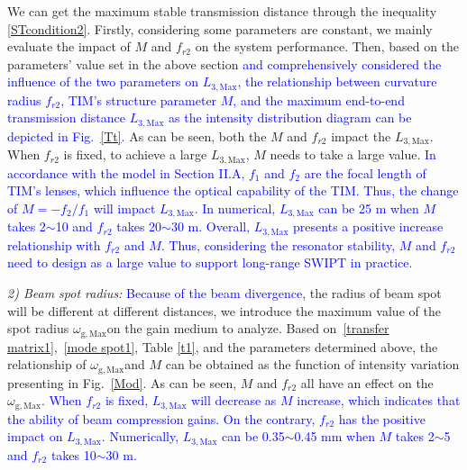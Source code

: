 \documentclass{IEEEtran}
\begin{document}
We can get the maximum stable transmission distance through the inequality \eqref{STcondition2}. 
Firstly, considering some parameters are constant, we mainly evaluate the impact of $M$ and $f_{r2}$ on the system performance.
Then, based on the parameters' value set in the above section \textcolor{blue}{and comprehensively considered the influence of the two parameters on $L_\mathrm{3,Max}$, the relationship between curvature radius $f_{r2}$, TIM's structure parameter $M$, and the maximum end-to-end transmission distance $L_\mathrm{3,Max}$ as the intensity distribution diagram can be depicted in Fig.~\ref{Tt}. }
As can be seen, both the $M$ and $f_{r2}$ impact the $L_\mathrm{3,Max}$. When $f_{r2}$ is fixed, to achieve a large $L_\mathrm{3,Max}$, $M$ needs to take a large value. \textcolor{blue}{In accordance with the model in Section II.A, $f_1$ and $f_2$ are the focal length of TIM's lenses, which influence the optical capability of the TIM. Thus, the change of $M=-f_2/f_1$ will impact $L_\mathrm{3,Max}$. }
\textcolor{blue}{In numerical, $L_\mathrm{3,Max}$ can be 25 m when $M$ takes 2$\sim$10 and $f_{r2}$ takes 20$\sim$30 m. Overall, $L_\mathrm{3,Max}$ presents a positive increase relationship with $f_{r2}$ and $M$. 
Thus, considering the resonator stability, $M$ and $f_{r2}$ need to design as a large value to support long-range SWIPT in practice. 
}

\emph{2) Beam spot radius:}
\textcolor{blue}{Because of the beam divergence}, the radius of beam spot will be different at different distances, we introduce the maximum value of the spot radius $\omega_\mathrm{g,Max}$on the gain medium to analyze. 
Based on~\eqref{transfer matrix1},~\eqref{mode spot1}, Table \ref{t1}, and the parameters determined above, the relationship of $\omega_\mathrm{g,Max}$and $M$ can be obtained as the function of intensity variation presenting in Fig.~\ref{Mod}.
As can be seen, $M$ and $f_{r2}$ all have an effect on the $\omega_\mathrm{g,Max}$. \textcolor{blue}{When $f_{r2}$ is fixed, $L_\mathrm{3,Max}$ will decrease as $M$ increase, which indicates that the ability of beam compression gains. On the contrary, $f_{r2}$ has the positive impact on $L_\mathrm{3,Max}$. }  \textcolor{blue}{Numerically, $L_\mathrm{3,Max}$ can be 0.35$\sim$0.45 mm when $M$ takes 2$\sim$5 and $f_{r2}$ takes 10$\sim$30 m. }
\end{document}
